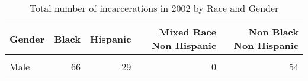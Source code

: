 \begin{table}[H]

\caption{\label{tab:tab:summarystats}Total number of incarcerations in 2002 by Race and Gender}
\centering
\begin{tabular}[t]{lrrrr}
\toprule
Gender & Black & Hispanic & Mixed Race Non Hispanic & Non Black Non Hispanic\\
\midrule
\cellcolor{gray!6}{Female} & \cellcolor{gray!6}{9} & \cellcolor{gray!6}{6} & \cellcolor{gray!6}{1} & \cellcolor{gray!6}{13}\\
Male & 66 & 29 & 0 & 54\\
\bottomrule
\end{tabular}
\end{table}
